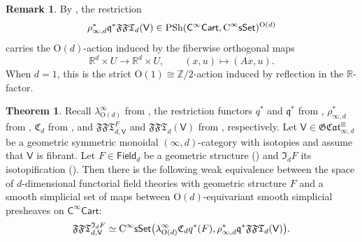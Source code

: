 \documentclass{amsart}
\newcommand{\cat}[1]{\mathsf{#1}}
\newcommand{\sset}{\cat{sSet}}
\newcommand{\we}{\simeq}
\newcommand{\CsSet}{\textnormal{C}^{\infty}\sset}
\newcommand{\fieldnoniso}[1]{\cat{Field}_{#1}}
\newcommand{\Cart}{\cat{C}^{\infty}\cat{Cart}}
\newcommand{\FFT}{\mathfrak{FFT}}
\newcommand{\GCat}{\mathfrak{G}\mathfrak{Cat}}
\newcommand{\psh}{\mathrm{PSh}}
\newcommand{\Cc}{\mathfrak{C}}
\newcommand{\RR}{{\mathbb{R}}}
\newcommand{\ZZ}{{\mathbb{Z}}}
\theoremstyle{definition}
\newtheorem{theorem}[equation]{Theorem}
\newtheorem{remark}[equation]{Remark}
\numberwithin{equation}{subsection}
\numberwithin{subsubsection}{subsection}
\begin{document}
\begin{remark}\label{rem:equivariant.core}
  By
  ,
  the restriction
  \[
    \rho_{\infty,d}^{*}\mathfrak{q}^{*}\FFT_d(\cat{V})
    \in\psh(\Cart,\CsSet)^{\mathrm{O}(d)}
  \]
  carries the \(\mathrm{O}(d)\)-action induced by the fiberwise orthogonal
  maps
  \[
    \RR^d\times U\longrightarrow\RR^d\times U,
    \qquad
    (x,u)\longmapsto(Ax,u).
  \]
  When \(d=1\), this is the strict
  \(\mathrm{O}(1)\cong\ZZ/2\)-action induced by reflection in the
  \(\RR\)-factor.
\end{remark}

\begin{theorem}\label{thm:moduli.space.reduction}
  Recall \(\lambda^{\infty}_{\mathrm{O}(d)}\) from
  , the restriction functors \(q^{*}\) and
  \(\mathfrak{q}^{*}\) from
  ,
  \(\rho_{\infty,d}^{*}\) from ,
  \(\Cc_d\) from , and
  \(\FFT_{d,\cat{V}}^{F}\) and \(\FFT_d(\cat{V})\) from
  ,
  respectively. Let \(\cat{V}\in
  \GCat^{\otimes}_{\infty,d}\) be a geometric
  symmetric monoidal \((\infty,d)\)-category with isotopies and assume that
  \(\cat{V}\) is fibrant. Let \(F\in \fieldnoniso{d}\) be a geometric structure
  () and \(
  \mathfrak{I}_{d}F \) its isotopification
  ().
  Then there is the following weak equivalence between the space of \( d
  \)-dimensional functorial field theories with geometric structure \(
  F \) and a smooth simplicial set of maps between \(\mathrm{O}(d)\)-equivariant
  smooth simplicial presheaves on \(\Cart\):
  \begin{equation*}
    \FFT_{d,\cat{V}}^{\mathfrak{I}_{d}F}\we
    \CsSet\bigl(\lambda^{\infty}_{\mathrm{O}(d)}\Cc_{d}q^{*}(F),\rho^{*}_{\infty,d}\mathfrak{q}^{*}\FFT_{d}(\cat{V})\bigr).
  \end{equation*}
\end{theorem}
\end{document}
